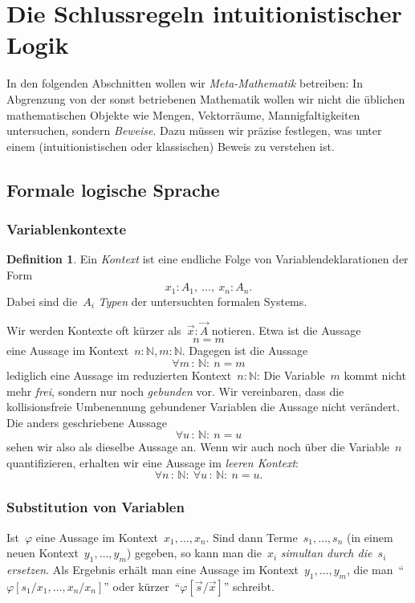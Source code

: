 \documentclass[a4paper,ngerman,12pt]{scrartcl}
\theoremstyle{definition}
\newtheorem{defn}{Definition}[section]
\theoremstyle{plain}
\theoremstyle{remark}
\newcommand{\NN}{\mathbb{N}}
\renewcommand{\_}{\mathpunct{.}\,}
\newcommand{\?}{\,{:}\,}
\begin{document}
\section{Die Schlussregeln intuitionistischer Logik}

\label{section:schlussregeln}%
In den folgenden Abschnitten wollen wir \emph{Meta-Mathematik} betreiben: In
Abgrenzung von der sonst betriebenen Mathematik wollen wir nicht die üblichen
mathematischen Objekte wie Mengen, Vektorräume, Mannigfaltigkeiten untersuchen,
sondern \emph{Beweise}. Dazu müssen wir präzise festlegen, was unter einem
(intuitionistischen oder klassischen) Beweis zu verstehen ist.


\subsection{Formale logische Sprache}

\subsubsection*{Variablenkontexte}

\begin{defn}Ein \emph{Kontext} ist eine endliche Folge von
Variablendeklarationen der Form
\[ x_1 : A_1,\ \ldots,\ x_n : A_n. \]
Dabei sind die~$A_i$ \emph{Typen} der untersuchten formalen Systems.\end{defn}

Wir werden Kontexte oft kürzer als~$\vec x : \vec A$ notieren. Etwa ist die
Aussage
\[ n = m \]
eine Aussage im Kontext~$n : \NN, m : \NN$. Dagegen ist die Aussage
\[ \forall m\?\NN{:}\ n = m \]
lediglich eine Aussage im reduzierten Kontext~$n : \NN$: Die Variable~$m$ kommt
nicht mehr \emph{frei}, sondern nur noch \emph{gebunden} vor. Wir vereinbaren,
dass die kollisionsfreie Umbenennung gebundener Variablen die Aussage nicht
verändert. Die anders geschriebene Aussage
\[ \forall u\?\NN{:}\ n = u \]
sehen wir also als dieselbe Aussage an.
Wenn wir auch noch über die
Variable~$n$ quantifizieren, erhalten wir eine Aussage im \emph{leeren Kontext}:
\[ \forall n\?\NN{:}\ \forall u\?\NN{:}\ n = u. \]


\subsubsection*{Substitution von Variablen}

Ist~$\varphi$ eine Aussage im Kontext~$x_1,\ldots,x_n$. Sind dann
Terme~$s_1,\ldots,s_n$ (in einem neuen Kontext~$y_1,\ldots,y_m$) gegeben, so
kann man die~$x_i$ \emph{simultan durch die~$s_i$ ersetzen}. Als Ergebnis
erhält man eine Aussage im Kontext~$y_1,\ldots,y_m$, die
man~"`$\varphi[s_1/x_1,\ldots,x_n/x_n]$"' oder kürzer~"`$\varphi[\vec s/\vec
x]$"' schreibt.
\end{document}
